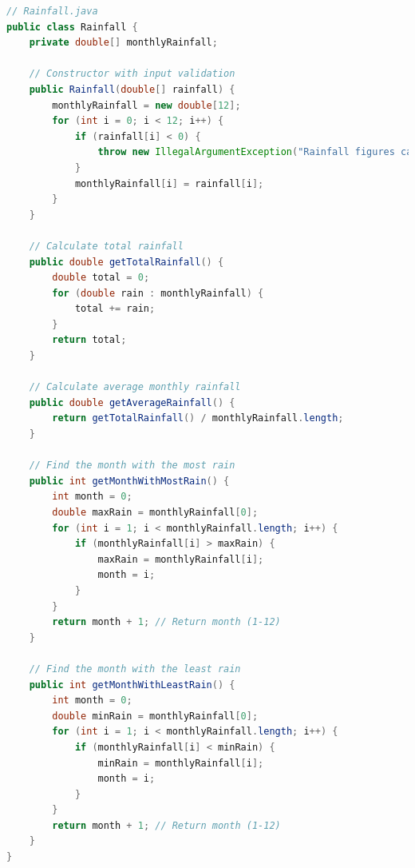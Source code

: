 \documentclass{article}
\begin{document}
\begin{lstlisting}[language=Java, caption=Rainfall.java]
// Rainfall.java
public class Rainfall {
    private double[] monthlyRainfall;

    // Constructor with input validation
    public Rainfall(double[] rainfall) {
        monthlyRainfall = new double[12];
        for (int i = 0; i < 12; i++) {
            if (rainfall[i] < 0) {
                throw new IllegalArgumentException("Rainfall figures cannot be negative.");
            }
            monthlyRainfall[i] = rainfall[i];
        }
    }

    // Calculate total rainfall
    public double getTotalRainfall() {
        double total = 0;
        for (double rain : monthlyRainfall) {
            total += rain;
        }
        return total;
    }

    // Calculate average monthly rainfall
    public double getAverageRainfall() {
        return getTotalRainfall() / monthlyRainfall.length;
    }

    // Find the month with the most rain
    public int getMonthWithMostRain() {
        int month = 0;
        double maxRain = monthlyRainfall[0];
        for (int i = 1; i < monthlyRainfall.length; i++) {
            if (monthlyRainfall[i] > maxRain) {
                maxRain = monthlyRainfall[i];
                month = i;
            }
        }
        return month + 1; // Return month (1-12)
    }

    // Find the month with the least rain
    public int getMonthWithLeastRain() {
        int month = 0;
        double minRain = monthlyRainfall[0];
        for (int i = 1; i < monthlyRainfall.length; i++) {
            if (monthlyRainfall[i] < minRain) {
                minRain = monthlyRainfall[i];
                month = i;
            }
        }
        return month + 1; // Return month (1-12)
    }
}
\end{lstlisting}
\end{document}
